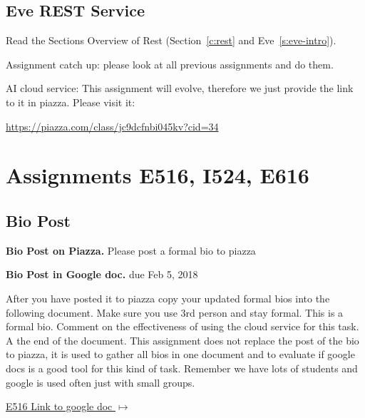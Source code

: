 \subsection{Eve REST Service}
\begin{exercise}
Read the Sections Overview of Rest (Section~\ref{c:rest} and Eve~\ref{s:eve-intro}).
\end{exercise}

\begin{exercise}
Assignment catch up: please look at all previous assignments and do
them. 
\end{exercise}

\begin{exercise}

AI cloud service: This assignment will evolve, therefore we just
provide the link to it in piazza. Please visit it:

\url{https://piazza.com/class/jc9dcfnbi045kv?cid=34}
\end{exercise}

\section{Assignments E516, I524, E616}
\label{s:616-assignments}

\subsection{Bio Post}\label{a:616-bio}

\begin{exercise}\label{E:616-bio-piazza}
{\bf Bio Post on Piazza.} Please post a formal bio to piazza
\end{exercise}

\begin{exercise}\label{E:616-bio-googledocs}

  {\bf Bio Post in Google doc.} due Feb 5, 2018
  
  After you have posted it to piazza
  copy your updated formal bios into the following document.  Make
  sure you use 3rd person and stay formal. This is a formal
  bio. Comment on the effectiveness of using the cloud service for
  this task. A the end of the document. This assignment does not
  replace the post of the bio to piazza, it is used to gather all bios
  in one document and to evaluate if google docs is a good tool for
  this kind of task. Remember we have lots of students and google is
  used often just with small groups.
 
 \smallskip

 {\hfill
   \href{https://docs.google.com/document/d/1ejzlKYqC3dLac8WXVpcPQsJh1j4BDqRxxgGg1cFQbeQ/edit?usp=sharing}{E516
     Link to google doc $\mapsto$}}


 \end{exercise}

